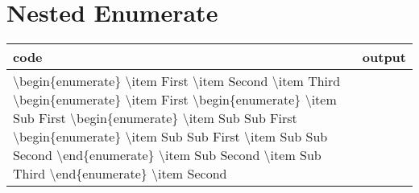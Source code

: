 \documentclass[a4paper, 10pt]{book}
\begin{document}
\section[Nested Enumerate]{Nested Enumerate}
\begin{table}[!h]
	\begin{tabularx}{15cm}{|X|X|}
		\hline
		\textbf{code} & \textbf{output} \\
		\hline
		\textbackslash begin\{enumerate\}   \newline
		\textbackslash item First   \newline        %
		\textbackslash item Second  \newline
		\textbackslash item Third   \newline
		\textbackslash begin\{enumerate\}   \newline
		\textbackslash item First   \newline        %
		\textbackslash begin\{enumerate\}   \newline
		\textbackslash item Sub First   \newline        %
		\textbackslash begin\{enumerate\}   \newline
		\textbackslash item Sub Sub First   \newline        %
		\textbackslash begin\{enumerate\}   \newline
		\textbackslash item Sub Sub First   \newline        %
		\textbackslash item Sub Sub Second   \newline        %
		\textbackslash end\{enumerate\} \newline
		\textbackslash item Sub Second   \newline        %
		\textbackslash item Sub Third   \newline        %
		\textbackslash end\{enumerate\} \newline
		\textbackslash item Second  \newline

\end{tabularx}
\end{table}
\end{document}
